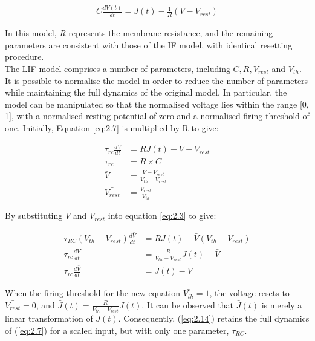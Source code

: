 \begin{align}
C \frac{dV(t)}{dt} = J(t) - \frac{1}{R} (V - V_{rest}) \label{eq:2.7} 
\end{align}

\noindent In this model, \textit{R} represents the membrane resistance, and the remaining parameters are consistent with those of the IF model, with identical resetting procedure.\\

\noindent The LIF model comprises a number of parameters, including $C, R, V_{rest}$ and $V_{th}$. It is possible to normalise the model in order to reduce the number of parameters while maintaining the full dynamics of the original model. In particular, the model can be manipulated so that the normalised voltage lies within the range [0, 1], with a normalised resting potential of zero and a normalised firing threshold of one. Initially, Equation \ref{eq:2.7} is multiplied by R to give:

\begin{align}
    \tau_{rc} \frac{dV}{dt} &= RJ(t) - V + V_{rest} \label{eq:2.8} \\
    \tau_{rc} &= R \times C \label{eq:2.9} \\
    \bar{V} &= \frac{V - V_{rest}}{V_{th} - V_{rest}} \label{eq:2.10} \\
    \bar{V_{rest}} &= \frac{V_{rest}}{V_{th}} \label{eq:2.11} 
\end{align}

\noindent By substituting $\bar{V}$ and $\bar{V_{rest}}$ into equation \ref{eq:2.3} to give:


\begin{align}
    \tau_{RC}(V_{th} - V_{rest})\frac{d\bar{V}}{dt} &= RJ(t) - \bar{V}(V_{th} - V_{rest})
    \label{eq:2.12} \\
    \tau_{rc}\frac{d\bar{V}}{dt} &= \frac{R}{V_{th} - V_{rest}} J(t) - \bar{V} \label{eq:2.13} \\
    \tau_{rc} \frac{d\bar{V}}{dt} &= \bar{J}(t) - \bar{V} \label{eq:2.14} 
\end{align}

\noindent When the firing threshold for the new equation $\bar{V_{th}} = 1$, the voltage resets to $\bar{V_{rest}} = 0$, and $\bar{J}(t) = \frac{R}{V_{th} - V_{rest}} J(t)$. It can be observed that $\bar{J}(t)$ is merely a linear transformation of $J(t)$. Consequently, (\ref{eq:2.14}) retains the full dynamics of (\ref{eq:2.7}) for a scaled input, but with only one parameter, $\tau_{RC}$. \\

